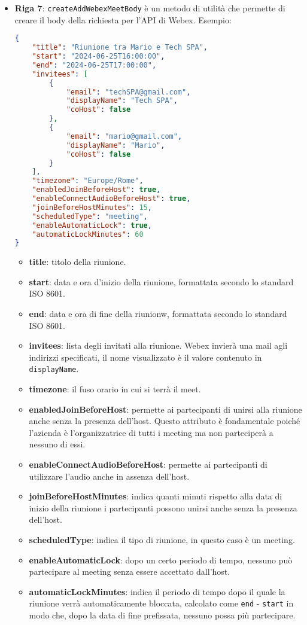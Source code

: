 \begin{itemize}
    \item \textbf{Riga 7}: \texttt{createAddWebexMeetBody} è un metodo di utilità che permette di creare il body
    della richiesta per l'API di Webex. Esempio:
    \begin{lstlisting}[language=json,firstnumber=1]
{
    "title": "Riunione tra Mario e Tech SPA",
    "start": "2024-06-25T16:00:00",
    "end": "2024-06-25T17:00:00",
    "invitees": [
        {
            "email": "techSPA@gmail.com",
            "displayName": "Tech SPA",
            "coHost": false
        },
        {
            "email": "mario@gmail.com",
            "displayName": "Mario",
            "coHost": false
        }
    ],
    "timezone": "Europe/Rome",
    "enabledJoinBeforeHost": true,
    "enableConnectAudioBeforeHost": true,
    "joinBeforeHostMinutes": 15,
    "scheduledType": "meeting",
    "enableAutomaticLock": true,
    "automaticLockMinutes": 60
}
    \end{lstlisting}
    \begin{itemize}
        \item \textbf{title}: titolo della riunione.
        \item \textbf{start}: data e ora d'inizio della riunione, formattata secondo lo standard ISO 8601.
        \item \textbf{end}: data e ora di fine della riunionw, formattata secondo lo standard ISO 8601.
        \item \textbf{invitees}: lista degli invitati alla riunione. Webex invierà una mail agli indirizzi specificati, il nome
        visualizzato è il valore contenuto in \texttt{displayName}.
        \item \textbf{timezone}: il fuso orario in cui si terrà il meet.
        \item \textbf{enabledJoinBeforeHost}: permette ai partecipanti di unirsi alla riunione anche senza la presenza dell'host. 
        Questo attributo è fondamentale poiché l'azienda è l'organizzatrice di tutti i meeting ma non parteciperà a nessuno di essi.
        \item \textbf{enableConnectAudioBeforeHost}: permette ai partecipanti di utilizzare l'audio anche in assenza dell'host.
        \item \textbf{joinBeforeHostMinutes}: indica quanti minuti rispetto alla data di inizio della riunione i partecipanti possono unirsi anche senza la presenza dell'host.
        \item \textbf{scheduledType}: indica il tipo di riunione, in questo caso è un meeting.
        \item \textbf{enableAutomaticLock}: dopo un certo periodo di tempo, nessuno può partecipare al meeting senza essere accettato dall'host.
        \item \textbf{automaticLockMinutes}: indica il periodo di tempo dopo il quale la riunione verrà automaticamente bloccata, 
        calcolato come \texttt{end} - \texttt{start} in modo che, dopo la data di fine prefissata, nessuno possa più partecipare.
    \end{itemize}


\end{itemize}
